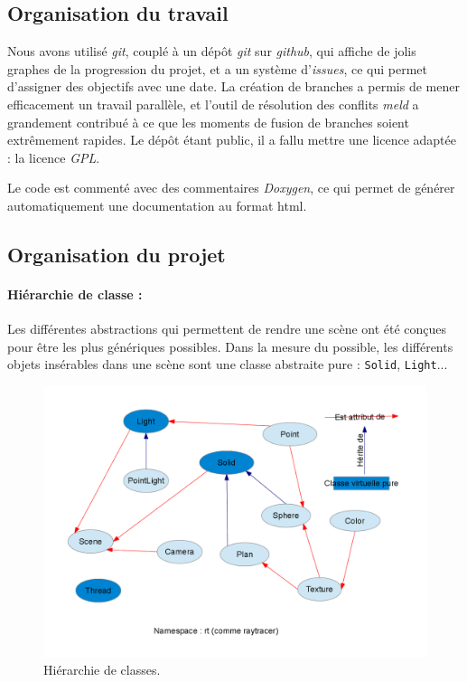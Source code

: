 \subsection{Organisation du travail}
  Nous avons utilisé \emph{git}, couplé à un dépôt \emph{git} sur \emph{github}, qui affiche de jolis graphes de la progression du projet, 
  et a un système d'\emph{issues}, ce qui permet d'assigner des objectifs avec une date. 
   La création de branches a permis de mener efficacement un travail parallèle, et l'outil de résolution des conflits \emph{meld} a grandement contribué à ce que les moments
  de fusion de branches soient extrêmement rapides.
  Le dépôt étant public, il a fallu mettre une licence adaptée : la licence \emph{GPL}.
  
  Le code est commenté avec des commentaires \emph{Doxygen}, ce qui permet de générer automatiquement une documentation au format html.
  
\subsection{Organisation du projet}

\paragraph{Hiérarchie de classe : } 
Les différentes abstractions qui permettent de rendre une scène ont été conçues pour être les plus génériques possibles. Dans la mesure du possible, les différents  objets insérables dans une scène sont une classe abstraite pure : \verb|Solid|, \verb|Light|...
\begin{figure}[h]
\begin{center}
\includegraphics[scale=0.35]{hierarchie.png}
\end{center}
\caption{Hiérarchie de classes.}
\end{figure}

